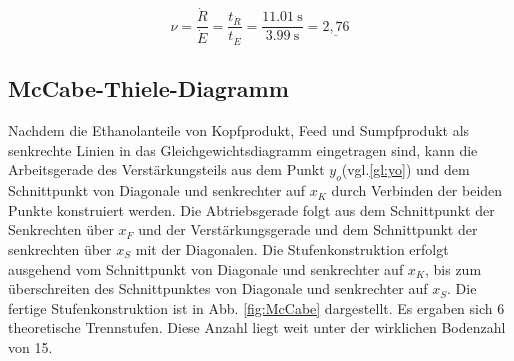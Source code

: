 \begin{equation}
	\nu=\frac{\dot{R}}{\dot{E}}=\frac{t_{\dot{R}}}{t_{\dot{E}}}=\frac{\SI{11,01}{\second}}{\SI{3,99}{\second}}=\underline{2,76}
\end{equation}

\subsection{McCabe-Thiele-Diagramm}
Nachdem die Ethanolanteile von Kopfprodukt, Feed und Sumpfprodukt als senkrechte Linien in das Gleichgewichtsdiagramm eingetragen sind, kann die Arbeitsgerade des Verstärkungsteils aus dem Punkt $y_o$(vgl.\eqref{gl:yo}) und dem Schnittpunkt von Diagonale und senkrechter auf $x_K$ durch Verbinden der beiden Punkte konstruiert werden. Die Abtriebsgerade folgt aus dem Schnittpunkt der Senkrechten über $x_F$ und der Verstärkungsgerade und dem Schnittpunkt der senkrechten über $x_S$ mit der Diagonalen. Die Stufenkonstruktion erfolgt ausgehend vom Schnittpunkt von Diagonale und senkrechter auf $x_K$, bis zum überschreiten des Schnittpunktes von Diagonale und senkrechter auf $x_S$. Die fertige Stufenkonstruktion ist in Abb. \ref{fig:McCabe} dargestellt. Es ergaben sich 6 theoretische Trennstufen. Diese Anzahl liegt weit unter der wirklichen Bodenzahl von 15. 

